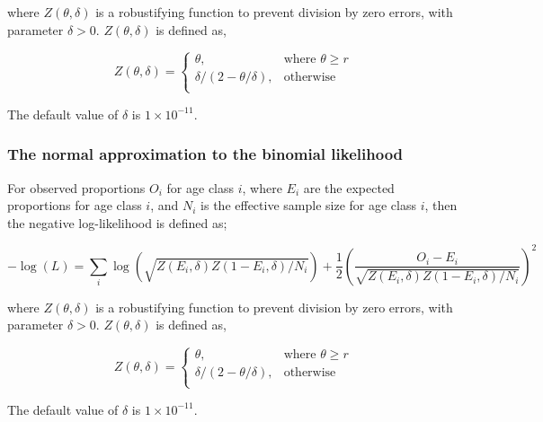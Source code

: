 {{{{{{where $Z \left(\theta,\delta \right)$ is a robustifying function to prevent division by zero errors, with parameter $\delta>0$. $Z \left(\theta,\delta \right)$ is defined as,

\begin{equation}
   Z \left(\theta,\delta \right) = \begin{cases}
	  \theta, & \text{where $\theta \ge r$} \\
	  \delta/\left( 2-\theta/\delta \right), & \text{otherwise} \\  
  \end{cases}
\end{equation}

The default value of $\delta$ is $1 \times 10^{-11}$.

\subsubsection*{The normal approximation to the binomial likelihood}

For observed proportions $O_i$ for age class $i$, where $E_i$ are the expected proportions for age class $i$, and $N_i$ is the effective sample size for age class $i$, then the negative log-likelihood is defined as;  

\begin{equation}
  -\log \left(L \right)= \sum\limits_i \log \left( \sqrt{Z\left(E_i,\delta \right)Z\left(1-E_i,\delta\right)/N_i} \right)     + \frac{1}{2} \left( \frac{O_i-E_i}{\sqrt{Z\left(E_i,\delta\right)Z\left(1-E_i,\delta \right)/N_i}} \right)^2
\end{equation}

where $Z \left(\theta,\delta \right)$ is a robustifying function to prevent division by zero errors, with parameter $\delta>0$. $Z \left(\theta,\delta \right)$ is defined as,

\begin{equation}
   Z \left(\theta,\delta \right) = \begin{cases}
	  \theta, & \text{where $\theta \ge r$} \\
	  \delta/\left( 2-\theta/\delta \right), & \text{otherwise} \\  
  \end{cases}
\end{equation}

The default value of $\delta$ is $1 \times 10^{-11}$.

\subsection{}

}}}}}}
